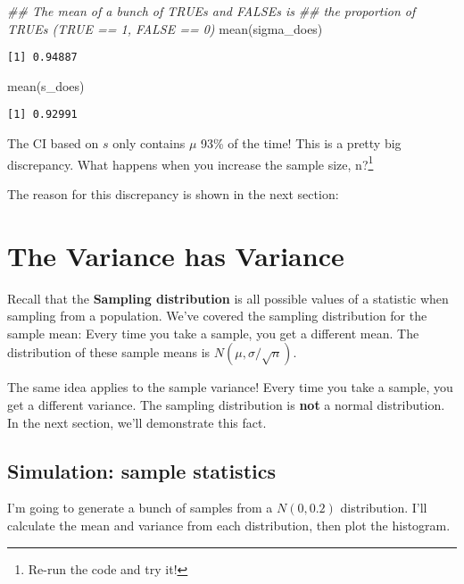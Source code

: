 \documentclass[
  letterpaper,
  DIV=11,
  numbers=noendperiod]{scrreprt}
\newenvironment{Shaded}{\begin{snugshade}}{\end{snugshade}}
\newcommand{\DocumentationTok}[1]{\textcolor[rgb]{0.37,0.37,0.37}{\textit{#1}}}
\newcommand{\FunctionTok}[1]{\textcolor[rgb]{0.28,0.35,0.67}{#1}}
\newcommand{\NormalTok}[1]{\textcolor[rgb]{0.00,0.23,0.31}{#1}}
\begin{document}
\begin{Shaded}
\begin{Highlighting}[]
\DocumentationTok{\#\# The mean of a bunch of TRUEs and FALSEs is}
\DocumentationTok{\#\# the proportion of TRUEs (TRUE == 1, FALSE == 0)}
\FunctionTok{mean}\NormalTok{(sigma\_does)}
\end{Highlighting}
\end{Shaded}

\begin{verbatim}
[1] 0.94887
\end{verbatim}

\begin{Shaded}
\begin{Highlighting}[]
\FunctionTok{mean}\NormalTok{(s\_does)}
\end{Highlighting}
\end{Shaded}

\begin{verbatim}
[1] 0.92991
\end{verbatim}

The CI based on \(s\) only contains \(\mu\) 93\% of the time! This is a
pretty big discrepancy. What happens when you increase the sample size,
n?\footnote{Re-run the code and try it!}

The reason for this discrepancy is shown in the next section:

\hypertarget{the-variance-has-variance}{%
\section{The Variance has Variance}\label{the-variance-has-variance}}

Recall that the \textbf{Sampling distribution} is all possible values of
a statistic when sampling from a population. We've covered the sampling
distribution for the sample mean: Every time you take a sample, you get
a different mean. The distribution of these sample means is
\(N(\mu,\sigma/\sqrt{n})\).

The same idea applies to the sample variance! Every time you take a
sample, you get a different variance. The sampling distribution is
\textbf{not} a normal distribution. In the next section, we'll
demonstrate this fact.

\hypertarget{simulation-sample-statistics}{%
\subsection{Simulation: sample
statistics}\label{simulation-sample-statistics}}

I'm going to generate a bunch of samples from a \(N(0, 0.2)\)
distribution. I'll calculate the mean and variance from each
distribution, then plot the histogram.
\end{document}
